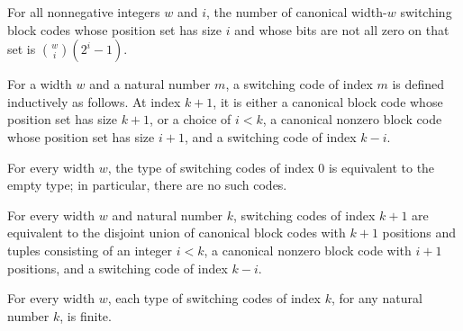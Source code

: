 \begin{theorem}
\label{FABL.SwitchingBlockCode.card_fullOfSize}
\leanok
{}
For all nonnegative integers $w$ and $i$, the number of canonical width-$w$ switching
block codes whose position set has size $i$ and whose bits are not all zero on that set
is $\binom{w}{i}(2^i-1)$.
\end{theorem}

\begin{definition}
\label{FABL.SwitchingCode}
\leanok
{}
For a width $w$ and a natural number $m$, a switching code of index $m$ is defined
inductively as follows. At index $k+1$, it is either a canonical block code whose
position set has size $k+1$, or a choice of $i<k$, a canonical nonzero block code whose
position set has size $i+1$, and a switching code of index $k-i$.
\end{definition}

\begin{definition}
\label{FABL.SwitchingCode.zeroEquivEmpty}
\leanok
{}
For every width $w$, the type of switching codes of index $0$ is equivalent to the empty
type; in particular, there are no such codes.
\end{definition}

\begin{definition}
\label{FABL.SwitchingCode.succEquiv}
\leanok
{}
For every width $w$ and natural number $k$, switching codes of index $k+1$ are
equivalent to the disjoint union of canonical block codes with $k+1$ positions and
tuples consisting of an integer $i<k$, a canonical nonzero block code with $i+1$
positions, and a switching code of index $k-i$.
\end{definition}

\begin{definition}
\label{FABL.SwitchingCode.fintype}
\leanok
{}
For every width $w$, each type of switching codes of index $k$, for any natural number
$k$, is finite.
\end{definition}

